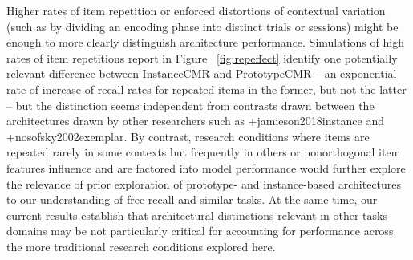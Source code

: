 {}Higher rates of item repetition or enforced distortions of contextual variation (such as by dividing an encoding phase into distinct trials or sessions) might be enough to more clearly distinguish architecture performance. Simulations of high rates of item repetitions report in Figure ~\ref{fig:repeffect} identify one potentially relevant difference between InstanceCMR and PrototypeCMR -- an exponential rate of increase of recall rates for repeated items in the former, but not the latter -- but the distinction seems independent from contrasts drawn between the architectures drawn by other researchers such as +{}{}{jamieson2018instance} and +{}{}{nosofsky2002exemplar}. By contrast, research conditions where items are repeated rarely in some contexts but frequently in others or nonorthogonal item features influence and are factored into model performance would further explore the relevance of prior exploration of prototype- and instance-based architectures to our understanding of free recall and similar tasks. At the same time, our current results establish that architectural distinctions relevant in other tasks domains may be not particularly critical for accounting for performance across the more traditional research conditions explored here.\markdownRendererInterblockSeparator
